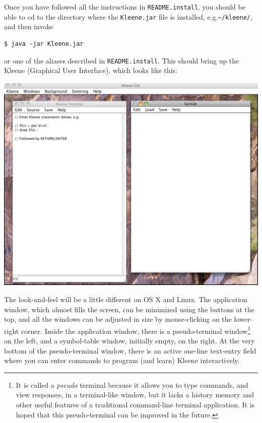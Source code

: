 Once you have followed all the instructions in \texttt{README.install},
you should be able to cd to the directory where the \texttt{Kleene.jar}
file is installed, e.g.\@ \texttt{\~{}/kleene/}, and then invoke 

\begin{Verbatim}
$ java -jar Kleene.jar
\end{Verbatim}

\noindent
or one of the aliases described in \texttt{README.install}.
This should bring up the Kleene  (Graphical User Interface),
which looks like this:


\begin{center}
\includegraphics[width=135mm]{images/KleeneGUI.pdf}
\end{center}


The look-and-feel will be a little different on OS X and Linux.  The
application window, which almost fills the screen, can be minimized using
the buttons at the top, and all the windows can be adjusted in size by
mouse-clicking on the lower-right corner.
Inside the application window, there is a
pseudo-terminal window\footnote{It is called a \emph{pseudo} terminal
because it allows you to type commands, and view responses, in a
terminal-like window, but it lacks a history memory and other useful
features of a traditional command-line terminal application.  It is hoped
that this pseudo-terminal can be improved in the future.}  on the left,
and a symbol-table window, initially empty, on the right.  At the very
bottom of the pseudo-terminal window, there is an active one-line
text-entry
field where you can enter commands to program (and learn) Kleene
interactively.  

